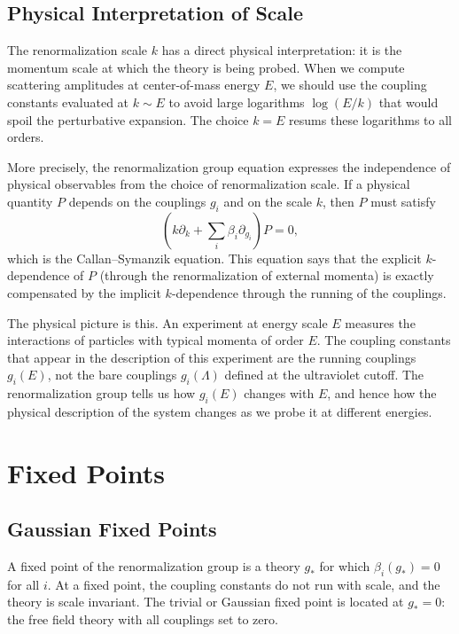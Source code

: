\documentclass[11pt, twoside, openright]{book}
\theoremstyle{dotted}
\theoremstyle{definition}
\begin{document}
\section{Physical Interpretation of Scale}

The renormalization scale $k$ has a direct physical interpretation: it is the
momentum scale at which the theory is being probed. When we compute scattering
amplitudes at center-of-mass energy $E$, we should use the coupling constants
evaluated at $k \sim E$ to avoid large logarithms $\log(E/k)$ that would spoil
the perturbative expansion. The choice $k = E$ resums these logarithms to all
orders.

More precisely, the renormalization group equation expresses the independence of
physical observables from the choice of renormalization scale. If a physical
quantity $P$ depends on the couplings $g_i$ and on the scale $k$, then $P$ must
satisfy
\begin{equation}
  \left(k\partial_k + \sum_i \beta_i \partial_{g_i}\right) P = 0,
  \label{eq:callan_symanzik}
\end{equation}
which is the Callan--Symanzik equation. This equation says that the explicit
$k$-dependence of $P$ (through the renormalization of external momenta) is
exactly compensated by the implicit $k$-dependence through the running of the
couplings.

The physical picture is this. An experiment at energy scale $E$ measures the
interactions of particles with typical momenta of order $E$. The coupling constants
that appear in the description of this experiment are the running couplings $g_i(E)$,
not the bare couplings $g_i(\Lambda)$ defined at the ultraviolet cutoff. The
renormalization group tells us how $g_i(E)$ changes with $E$, and hence how the
physical description of the system changes as we probe it at different energies.

\chapter{Fixed Points}
\label{ch:fixed_points}

\section{Gaussian Fixed Points}

A fixed point of the renormalization group is a theory $g_*$ for which
$\beta_i(g_*) = 0$ for all $i$. At a fixed point, the coupling constants do not
run with scale, and the theory is scale invariant. The trivial or Gaussian fixed
point is located at $g_* = 0$: the free field theory with all couplings set to
zero.
\end{document}
